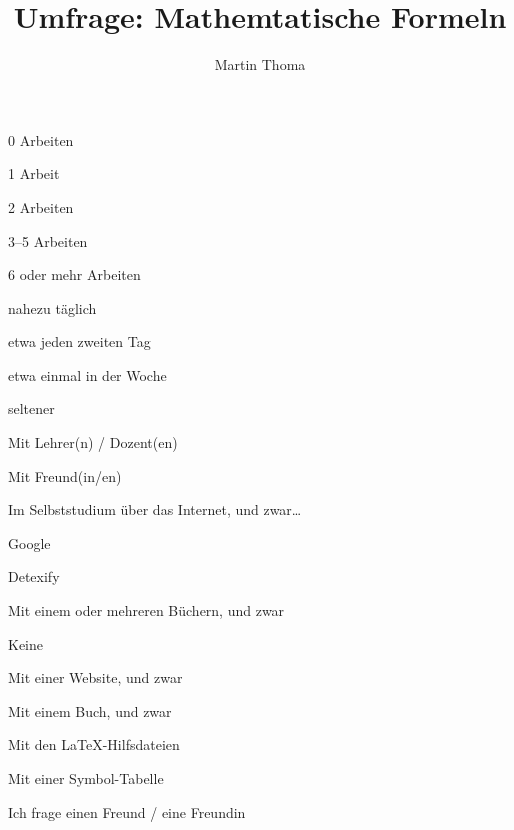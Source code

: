 \documentclass[a4paper]{scrreprt}
\title{Umfrage: Mathemtatische Formeln}
\author{Martin Thoma}
\begin{document}


\begin{answersC}
\item 0 Arbeiten
\item 1 Arbeit
\item 2 Arbeiten
\item 3--5 Arbeiten
\item 6 oder mehr Arbeiten
\end{answersC}

\begin{answersC}
\item nahezu täglich
\item etwa jeden zweiten Tag
\item etwa einmal in der Woche
\item seltener
\end{answersC}

\begin{longanswersC}
\item Mit Lehrer(n) / Dozent(en)
\item Mit Freund(in/en)
\item Im Selbststudium über das Internet, und zwar\dots
    \begin{longanswersC}
    \item Google
    \item Detexify
    \item {}
    \end{longanswersC}
\item Mit einem oder mehreren Büchern, und zwar 
\end{longanswersC}

\clearpage

\begin{longanswersC}
\item Keine
\item Mit einer Website, und zwar 
\item Mit einem Buch, und zwar 
\item Mit den \LaTeX-Hilfsdateien
\item Mit einer Symbol-Tabelle
\item Ich frage einen Freund / eine Freundin
\end{longanswersC}
\end{document}
